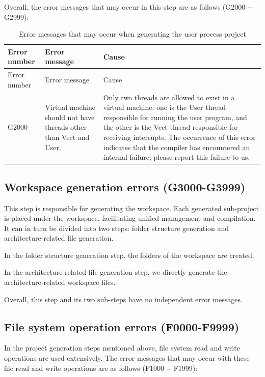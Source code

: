 Overall, the error messages that may occur in this step are as follows (G2000 -\/- G2999):

\begin{xltabular}{\textwidth}{@{}>{\hsize\raggedright\arraybackslash}X>{\hsize\raggedright\arraybackslash}X>{\hsize\raggedright\arraybackslash}X@{}}
\caption{Error messages that may occur when generating the user process project}\label{tab:5-28}\\
\toprule
Error number & Error message & Cause\tabularnewline
\endfirsthead
\toprule
Error number & Error message & Cause\tabularnewline
\midrule
\endhead
\bottomrule
\endlastfoot
G2000 & Virtual machine should not have threads other than Vect and
User. &
Only two threads are allowed to exist in a virtual machine: one is the User thread responsible for running the user program, and the other is the Vect thread responsible for receiving interrupts. The occurrence of this error indicates that the compiler has encountered an internal failure; please report this failure to us.\tabularnewline
\end{xltabular}

\subsection{Workspace generation errors (G3000-G3999)}\label{subsec:5-6-10}

This step is responsible for generating the workspace. Each generated sub-project is placed under the workspace, facilitating unified management and compilation. It can in turn be divided into two steps: folder structure generation and architecture-related file generation.

In the folder structure generation step, the folders of the workspace are created.

In the architecture-related file generation step, we directly generate the architecture-related workspace files.

Overall, this step and its two sub-steps have no independent error messages.

\subsection{File system operation errors (F0000-F9999)}\label{subsec:5-6-11}

In the project generation steps mentioned above, file system read and write operations are used extensively. The error messages that may occur with these file read and write operations are as follows (F1000
-\/- F1999):

